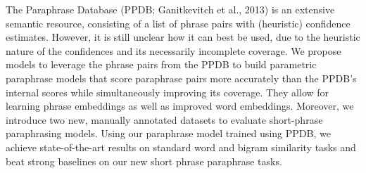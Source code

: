The Paraphrase Database (PPDB; Ganitkevitch et al., 2013) is an extensive semantic resource, consisting of a list of phrase pairs with (heuristic) confidence estimates. However, it is still unclear how it can best be used, due to the heuristic nature of the confidences and its necessarily incomplete coverage. We propose models to leverage the phrase pairs from the PPDB to build parametric paraphrase models that score paraphrase pairs more accurately than the PPDB's internal scores while simultaneously improving its coverage. They allow for learning phrase embeddings as well as improved word embeddings. Moreover, we introduce two new, manually annotated datasets to evaluate short-phrase paraphrasing models. Using our paraphrase model trained using PPDB, we achieve state-of-the-art results on standard word and bigram similarity tasks and beat strong baselines on our new short phrase paraphrase tasks.
